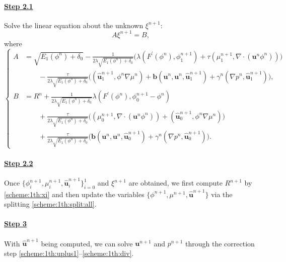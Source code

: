 \paragraph{\bf\underline{Step 2.1}} Solve the linear equation about the unknown $\xi^{n+1}$:
\begin{equation} \label{scheme:1th:algebraic_system}
		A \xi^{n+1} =B, 
\end{equation}
where
\begin{equation*}  
	\left\{
	\begin{aligned}
		A &=\sqrt{E_1(\phi^n)+\delta_0}-\frac{1}{2 \lambda   \sqrt{E_1(\phi^n)+\delta_0}}
		\big(\lambda (F^{\prime}(\phi^n), \phi_1^{n+1})+ \tau(\mu_1^{n+1}, \nabla \cdot ( \bm u^n \phi^n))\big) \\
		&\qquad -\frac{\tau}{2\lambda \sqrt{E_1(\phi^n)+\delta_0}}\big( (\widehat{\bm u}_1^{n+1}, \phi^n \nabla \mu^n)+ \bm b({\bm u}^n, {\bm u}^n, \widehat{\bm u}_1^{n+1})+\gamma^n  (\nabla p^n, \widehat{\bm u}_1^{n+1}) \big), \\
		B &= R^n+\frac{1}{2\lambda \sqrt{E_1(\phi^n)+\delta_0}}\lambda( F^{\prime}(\phi^n), \phi_0^{n+1}-\phi^n)\\
		&\qquad + \frac{\tau}{2\lambda \sqrt{E_1(\phi^n)+\delta_0}} \big((\mu_0^{n+1}, \nabla \cdot (  \bm u^n \phi^n))+ ( \widehat{\bm u}_0^{n+1}, \phi^n \nabla \mu^n)\big) \\
		&\qquad +\frac{\tau}{2\lambda \sqrt{E_1(\phi^n)+\delta_0}}\big( \bm b({\bm u}^n, {\bm u}^n, \widehat{\bm u}_0^{n+1})+\gamma^n (\nabla p^n, \widehat{\bm u}_0^{n+1})\big).
	\end{aligned}\right.
\end{equation*}

\paragraph{\bf\underline{Step 2.2}}  Once $\{\phi_i^{n+1}, \mu_i^{n+1}, \widehat{\bm u}_i^{n+1}\}_{i=0}^1$ and $\xi^{n+1}$ are obtained, we first compute $R^{n+1}$ by \eqref{scheme:1th:xi} and then update the variables $\{\phi^{n+1}, \mu^{n+1}, \widehat{\bm u}^{n+1}\}$ via the splitting \eqref{scheme:1th:split:all}.

\paragraph{\bf\underline{Step 3}} With $\widehat{\bm u}^{n+1}$ being computed, we can solve $\bm u^{n+1}$ and $p^{n+1}$ through the correction step \eqref{scheme:1th:uplus1}--\eqref{scheme:1th:div}. 

